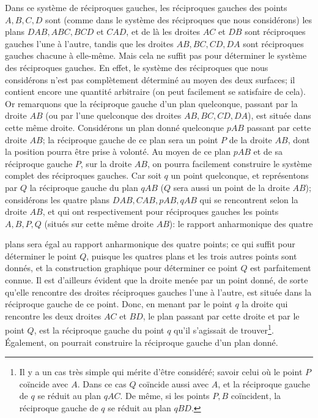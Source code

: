 \documentclass[10pt]{article}
\newcommand{\qedpage}{\vfill\pagebreak}
\begin{document}
Dans ce syst\`eme de r\'eciproques gauches, les r\'eciproques gauches des points
$A,B,C,D$ sont (comme dans le syst\`eme des r\'eciproques que nous consid\'erons) les
plans $DAB,ABC,BCD$ et $CAD$, et de l\`a les droites $AC$ et $DB$ sont
r\'eciproques gauches l'une \`a l'autre, tandis que les droites $AB,BC,CD,DA$ sont
r\'eciproques gauches chacune \`a elle-m\^eme. Mais cela ne suffit pas pour d\'eterminer
le syst\`eme des r\'eciproques gauches. En effet, le syst\`eme des r\'eciproques que nous
consid\'erons n'est pas compl\`etement d\'etermin\'e au moyen des deux surfaces; il
contient encore une quantit\'e arbitraire (on peut facilement se satisfaire de cela).
Or remarquons que la r\'eciproque gauche d'un plan quelconque, passant par la
droite $AB$ (ou par l'une quelconque des droites $AB,BC,CD,DA$), est situ\'ee dans
cette m\^eme droite. Consid\'erons un plan donn\'e quelconque $pAB$ passant par cette
droite $AB$; la r\'eciproque gauche de ce plan sera un point $P$ de la droite $AB$,
dont la position pourra \^etre prise \`a volont\'e. Au moyen de ce plan $pAB$ et de sa
r\'eciproque gauche $P$, sur la droite $AB$, on pourra facilement construire le
syst\`eme complet des r\'eciproques gauches. Car soit $q$ un point quelconque, et
repr\'esentons par $Q$ la r\'eciproque gauche du plan $qAB$ ($Q$ sera aussi un point de
la droite $AB$); consid\'erons les quatre plans $DAB,CAB,pAB,qAB$ qui se rencontrent
selon la droite $AB$, et qui ont respectivement pour r\'eciproques gauches les points
$A,B,P,Q$ (situ\'es sur cette m\^eme droite $AB$): le rapport anharmonique des quatre
\qedpage

plans sera \'egal au rapport anharmonique des quatre points; ce qui suffit pour
d\'eterminer le point $Q$, puisque les quatres plans et les trois autres points sont
donn\'es, et la construction graphique pour d\'eterminer ce point $Q$ est parfaitement
connue. Il est d'ailleurs \'evident que la droite men\'ee par un point donn\'e, de sorte
qu'elle rencontre des droites r\'eciproques gauches l'une \`a l'autre, est situ\'ee dans
la r\'eciproque gauche de ce point. Donc, en menant par le point $q$ la droite qui
rencontre les deux droites $AC$ et $BD$, le plan passant par cette droite et par le
point $Q$, est la r\'eciproque gauche du point $q$ qu'il s'agissait de trouver\footnote{Il
y a un cas tr\`es simple qui m\'erite d'\^etre consid\'er\'e; savoir celui o\`u le point
$P$ co\"incide avec $A$. Dans ce cas $Q$ co\"incide aussi avec $A$, et la r\'eciproque
gauche de $q$ se r\'eduit au plan $qAC$. De m\^eme, si les points $P,B$ co\"incident,
la r\'eciproque gauche de $q$ se r\'eduit au plan $qBD$.}. \'Egalement, on pourrait
construire la r\'eciproque gauche d'un plan donn\'e.
\end{document}
